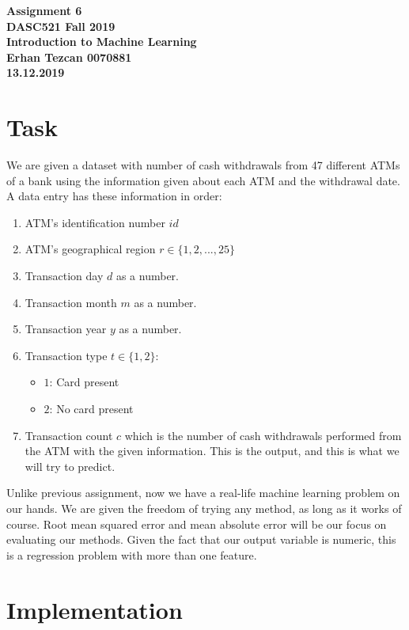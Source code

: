 \documentclass[11pt,reqno]{amsart}
\begin{document}
\begin{center}
\large\textbf{Assignment 6 \\ DASC521 Fall 2019} \\
\normalsize\textbf{Introduction to Machine Learning \\  Erhan Tezcan 0070881 \\ 13.12.2019} \\
\end{center}

\section{Task}
We are given a dataset with number of cash withdrawals from 47 different ATMs of a bank using the information given about each ATM and the withdrawal date. A data entry has these information in order:
\begin{enumerate}
	\item ATM's identification number $id$
	\item ATM's geographical region $r \in \{1, 2, ..., 25\}$
	\item Transaction day $d$ as a number.
	\item Transaction month $m$ as a number.
	\item Transaction year $y$ as a number.
	\item Transaction type $t \in \{1, 2\}$: \begin{itemize}
		\item $1$: Card present
		\item $2$: No card present
		\end{itemize}
	\item Transaction count $c$ which is the number of cash withdrawals performed from the ATM with the given information. This is the output, and this is what we will try to predict.
\end{enumerate}
Unlike previous assignment, now we have a real-life machine learning problem on our hands. We are given the freedom of trying any method, as long as it works of course. Root mean squared error and mean absolute error will be our focus on evaluating our methods. Given the fact that our output variable is numeric, this is a regression problem with more than one feature.

\section{Implementation}
\end{document}
